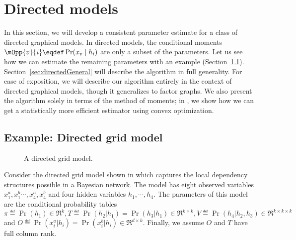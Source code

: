 \section{Directed models}
\label{sec:directed}



  In this section, we will develop a consistent parameter estimate for a class of directed graphical models.
  In directed models, the conditional moments $\mOpp{v}{i} \eqdef \Pr(x_v \mid h_i)$
  are only a subset of the parameters.
  Let us see how we can estimate the remaining parameters with an example (Section~\ref{sec:directedExample}).
  Section~\ref{sec:directedGeneral} will describe the algorithm in full generality.
For ease of exposition, we will describe our algorithm entirely in the
  context of directed graphical models, though it generalizes to factor
  graphs.
We also present the algorithm solely in terms of the method of moments; in
  , we show how we can get a statistically more
  efficient estimator using convex optimization.

\subsection{Example: Directed grid model}
\label{sec:directedExample}

\begin{figure}
  \centering
  
  \caption{A directed grid model.}
  \label{fig:grid}
\end{figure}

Consider the directed grid model shown in  which
  captures the local dependency structures possible in
  a Bayesian network.
The model has eight observed variables $x^a_1, x^b_1 \cdots, x^a_4, x^b_4$ and four
  hidden variables $h_1, \cdots, h_4$.
The parameters of this model are the conditional probability tables
$\pi \eqdef \Pr(h_1) \in \Re^k, T \eqdef \Pr(h_2 | h_1) = \Pr(h_3 | h_1) \in \Re^{k \times k},
V \eqdef \Pr(h_4 | h_2, h_3) \in \Re^{k \times k \times k}$ and $O \eqdef \Pr(x^a_i | h_i)
=  \Pr(x^b_i | h_i) \in \Re^{d \times k}$. 
Finally, we assume $O$ and $T$ have full column rank.

